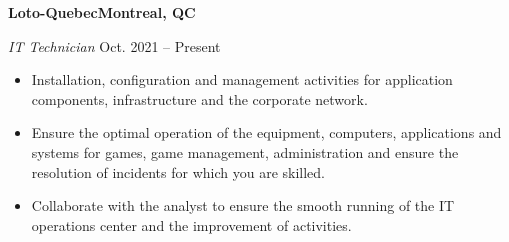 \textbf{Loto-Quebec\hfill  Montreal, QC} \par
\textit{IT Technician} \hfill Oct. 2021 -- Present \par
\begin{itemize}
	\item Installation, configuration and management activities for application components, infrastructure and the corporate network.
	\item Ensure the optimal operation of the equipment, computers, applications and systems for games, game management, administration and ensure the resolution of incidents for which you are skilled.
	
	\item Collaborate with the analyst to ensure the smooth running of the IT operations center and the improvement of activities.
\end{itemize} \par